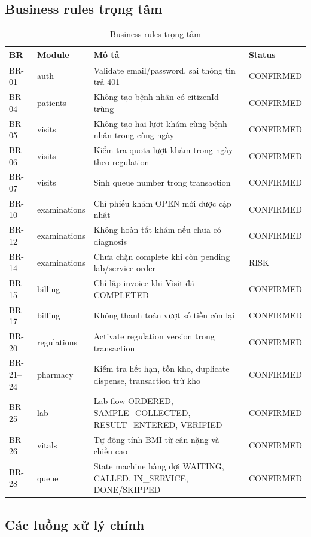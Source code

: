 \subsection{Business rules trọng tâm}

\begin{longtable}{|p{1.8cm}|p{3cm}|p{7cm}|p{2.8cm}|}
\caption{Business rules trọng tâm}\\
\hline
\textbf{BR} & \textbf{Module} & \textbf{Mô tả} & \textbf{Status} \\
\hline
BR-01 & auth & Validate email/password, sai thông tin trả 401 & CONFIRMED \\
\hline
BR-04 & patients & Không tạo bệnh nhân có citizenId trùng & CONFIRMED \\
\hline
BR-05 & visits & Không tạo hai lượt khám cùng bệnh nhân trong cùng ngày & CONFIRMED \\
\hline
BR-06 & visits & Kiểm tra quota lượt khám trong ngày theo regulation & CONFIRMED \\
\hline
BR-07 & visits & Sinh queue number trong transaction & CONFIRMED \\
\hline
BR-10 & examinations & Chỉ phiếu khám OPEN mới được cập nhật & CONFIRMED \\
\hline
BR-12 & examinations & Không hoàn tất khám nếu chưa có diagnosis & CONFIRMED \\
\hline
BR-14 & examinations & Chưa chặn complete khi còn pending lab/service order & RISK \\
\hline
BR-15 & billing & Chỉ lập invoice khi Visit đã COMPLETED & CONFIRMED \\
\hline
BR-17 & billing & Không thanh toán vượt số tiền còn lại & CONFIRMED \\
\hline
BR-20 & regulations & Activate regulation version trong transaction & CONFIRMED \\
\hline
BR-21--24 & pharmacy & Kiểm tra hết hạn, tồn kho, duplicate dispense, transaction trừ kho & CONFIRMED \\
\hline
BR-25 & lab & Lab flow ORDERED, SAMPLE\_COLLECTED, RESULT\_ENTERED, VERIFIED & CONFIRMED \\
\hline
BR-26 & vitals & Tự động tính BMI từ cân nặng và chiều cao & CONFIRMED \\
\hline
BR-28 & queue & State machine hàng đợi WAITING, CALLED, IN\_SERVICE, DONE/SKIPPED & CONFIRMED \\
\hline
\end{longtable}

\subsection{Các luồng xử lý chính}


